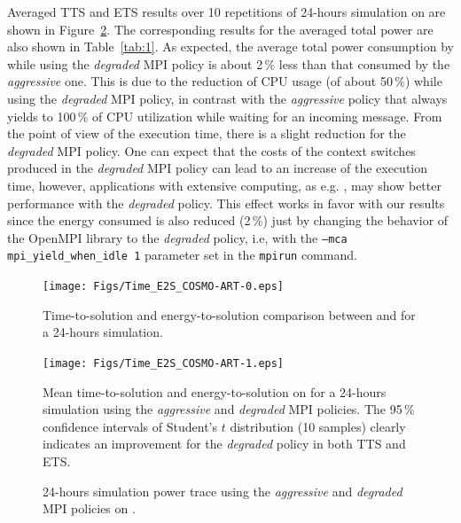 Averaged TTS and ETS results  over 10 repetitions of 24-hours simulation on
\tinto are shown in  Figure~\ref{fig:4}. The corresponding results for
the  averaged total  power are  also shown  in  Table~\ref{tab:1}.  As
expected, the average total power consumption by \cosmoart while using
the \emph{degraded} MPI policy is about  2\,\% less than that consumed by the
\emph{aggressive} one. This is  due to  the reduction of CPU usage (of about 50\,\%) while using  the \emph{degraded} MPI policy, in
contrast with the \emph{aggressive} policy that always yields to 100\,\% of CPU utilization while waiting for an incoming message. From the point of  view of the execution time, there is a
slight reduction  for the \emph{degraded} MPI  policy. One can  expect that the
costs of the context switches produced in the \emph{degraded} MPI policy can lead to
an  increase  of  the   execution  time,  however,  applications  with
extensive computing,  as e.g.  \cosmoart, may show  better performance
with the \emph{degraded} policy. This effect works in  favor with our results
since the energy consumed is also reduced (2\,\%) just by changing the
behavior of the OpenMPI library  to the \emph{degraded} policy, i.e, with the
\texttt{--mca    mpi\_yield\_when\_idle 1}   parameter   set    in   the
\texttt{mpirun} command.

\begin{figure}[htbf]
  \centering
  \texttt{[image: Figs/Time\_E2S\_COSMO-ART-0.eps]}
  \caption{Time-to-solution and  energy-to-solution comparison between
    \pilat and \monch for a 24-hours simulation.}
  \label{fig:3}
\end{figure}

\begin{figure}[htbf]
  \centering
  \texttt{[image: Figs/Time\_E2S\_COSMO-ART-1.eps]}
  \vspace{-1cm}
  \caption{Mean time-to-solution and  energy-to-solution on \tinto for
    a 24-hours simulation using the  \emph{aggressive} and \emph{degraded} MPI policies. The
    95\,\%  confidence  intervals of  Student's  $t$ distribution  (10
    samples) clearly  indicates an improvement for the \emph{degraded} policy in
    both TTS and ETS.}
  \label{fig:4}
\end{figure}

\begin{figure}[ht]
  \centering
  \hspace{0.8cm} \scalebox{0.62}{}
  \caption{24-hours simulation power  trace  using  the \emph{aggressive}  and
    \emph{degraded} MPI policies on \tinto.}
  \label{fig:5}
\end{figure}

